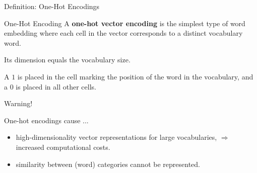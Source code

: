 \begin{frame}{Definition: One-Hot Encodings}

    \begin{definitionBlock}{One-Hot Encoding}
    A \textbf{\alert{one-hot vector encoding}} is the simplest type of word embedding where each cell in the vector corresponds to a distinct vocabulary word. 
    
    Its dimension equals the vocabulary size.
    
    A $1$ is placed in the cell marking the position of the word in the vocabulary, and a $0$ is placed in all other cells.
    \end{definitionBlock}
    
    \begin{alertBlock}{Warning!}
    
    One-hot encodings cause ...
    
    \begin{itemize}
        \item high-dimensionality vector representations for large vocabularies, $\Rightarrow$ increased computational costs.
        
        \item similarity between (word) categories cannot be represented.
    \end{itemize} 
    
    \end{alertBlock}
    
\end{frame}



